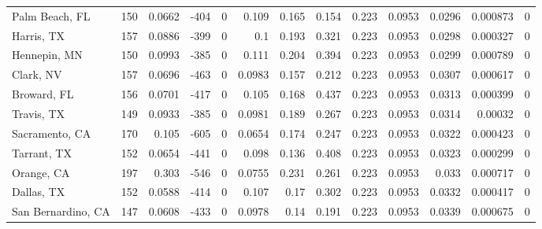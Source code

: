 \documentclass[12pt,letterpaper]{article}
\begin{document}
\begin{sidewaystable}
{\begin{tabular}{lrrrrrrrrrrrr}
 Palm Beach, FL     & 150   & 0.0662  & -404   &     0 &         0.109   &           0.165  &         0.154  &              0.223 &             0.0953 &           0.0296  &        0.000873 &                0 \\
 Harris, TX         & 157   & 0.0886  & -399   &     0 &         0.1     &           0.193  &         0.321  &              0.223 &             0.0953 &           0.0298  &        0.000327 &                0 \\
 Hennepin, MN       & 150   & 0.0993  & -385   &     0 &         0.111   &           0.204  &         0.394  &              0.223 &             0.0953 &           0.0299  &        0.000789 &                0 \\
 Clark, NV          & 157   & 0.0696  & -463   &     0 &         0.0983  &           0.157  &         0.212  &              0.223 &             0.0953 &           0.0307  &        0.000617 &                0 \\
 Broward, FL        & 156   & 0.0701  & -417   &     0 &         0.105   &           0.168  &         0.437  &              0.223 &             0.0953 &           0.0313  &        0.000399 &                0 \\
 Travis, TX         & 149   & 0.0933  & -385   &     0 &         0.0981  &           0.189  &         0.267  &              0.223 &             0.0953 &           0.0314  &        0.00032  &                0 \\
 Sacramento, CA     & 170   & 0.105   & -605   &     0 &         0.0654  &           0.174  &         0.247  &              0.223 &             0.0953 &           0.0322  &        0.000423 &                0 \\
 Tarrant, TX        & 152   & 0.0654  & -441   &     0 &         0.098   &           0.136  &         0.408  &              0.223 &             0.0953 &           0.0323  &        0.000299 &                0 \\
 Orange, CA         & 197   & 0.303   & -546   &     0 &         0.0755  &           0.231  &         0.261  &              0.223 &             0.0953 &           0.033   &        0.000717 &                0 \\
 Dallas, TX         & 152   & 0.0588  & -414   &     0 &         0.107   &           0.17   &         0.302  &              0.223 &             0.0953 &           0.0332  &        0.000417 &                0 \\
 San Bernardino, CA & 147   & 0.0608  & -433   &     0 &         0.0978  &           0.14   &         0.191  &              0.223 &             0.0953 &           0.0339  &        0.000675 &                0 \\

\end{tabular}}
\end{sidewaystable}
\end{document}

